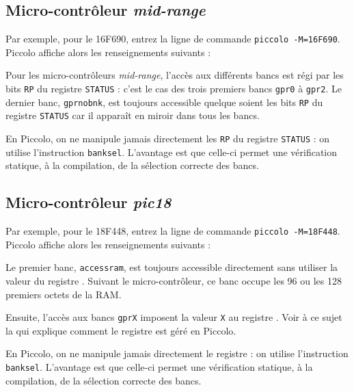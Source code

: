\subsection{Micro-contrôleur \emph{mid-range}}

Par exemple, pour le 16F690, entrez la ligne de commande \texttt{piccolo -M=16F690}. Piccolo affiche alors les renseignements suivants :



Pour les micro-contrôleurs \emph{mid-range}, l'accès aux différents bancs est régi par les bits \texttt{RP} du registre \texttt{STATUS} : c'est le cas des trois premiers bancs \texttt{gpr0} à \texttt{gpr2}. Le dernier banc, \texttt{gprnobnk}, est toujours accessible quelque soient les bits \texttt{RP} du registre \texttt{STATUS} car il apparaît en miroir dans tous les bancs.

En Piccolo, on ne manipule jamais directement les \texttt{RP} du registre \texttt{STATUS} : on utilise l'instruction \texttt{banksel}. L'avantage est que celle-ci permet une vérification statique, à la compilation, de la sélection correcte des bancs.


\subsection{Micro-contrôleur \emph{pic18}}

Par exemple, pour le 18F448, entrez la ligne de commande \texttt{piccolo -M=18F448}. Piccolo affiche alors les renseignements suivants :



Le premier banc, \texttt{accessram}, est toujours accessible directement sans utiliser la valeur du registre . Suivant le micro-contrôleur, ce banc occupe les 96 ou les 128 premiers octets de la RAM.

Ensuite, l'accès aux bancs \texttt{gprX} imposent la valeur \texttt{X} au registre . Voir à ce sujet la  qui explique comment le registre  est géré en Piccolo.

En Piccolo, on ne manipule jamais directement le registre  : on utilise l'instruction \texttt{banksel}. L'avantage est que celle-ci permet une vérification statique, à la compilation, de la sélection correcte des bancs.







